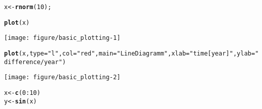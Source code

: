 \documentclass[a4paper,10pt]{book}\usepackage[]{graphicx}\usepackage[]{color}
\makeatletter
\def\maxwidth{ %
  \ifdim\Gin@nat@width>\linewidth
    \linewidth
  \else
    \Gin@nat@width
  \fi
}
\newcommand{\hlnum}[1]{\textcolor[rgb]{0.686,0.059,0.569}{#1}}%
\newcommand{\hlstr}[1]{\textcolor[rgb]{0.192,0.494,0.8}{#1}}%
\newcommand{\hlopt}[1]{\textcolor[rgb]{0,0,0}{#1}}%
\newcommand{\hlstd}[1]{\textcolor[rgb]{0.345,0.345,0.345}{#1}}%
\newcommand{\hlkwb}[1]{\textcolor[rgb]{0.69,0.353,0.396}{#1}}%
\newcommand{\hlkwc}[1]{\textcolor[rgb]{0.333,0.667,0.333}{#1}}%
\newcommand{\hlkwd}[1]{\textcolor[rgb]{0.737,0.353,0.396}{\textbf{#1}}}%
\newenvironment{kframe}{%
 \def\at@end@of@kframe{}%
 \ifinner\ifhmode%
  \def\at@end@of@kframe{\end{minipage}}%
  \begin{minipage}{\columnwidth}%
 \fi\fi%
 \def\FrameCommand##1{\hskip\@totalleftmargin \hskip-\fboxsep
 \colorbox{shadecolor}{##1}\hskip-\fboxsep
     \hskip-\linewidth \hskip-\@totalleftmargin \hskip\columnwidth}%
 \MakeFramed {\advance\hsize-\width
   \@totalleftmargin\z@ \linewidth\hsize
   \@setminipage}}%
 {\par\unskip\endMakeFramed%
 \at@end@of@kframe}
\newenvironment{knitrout}{}{} %
\makeatother
\begin{document}
\begin{knitrout}
\color{fgcolor}\begin{kframe}
\begin{alltt}
\hlstd{x} \hlkwb{<-} \hlkwd{rnorm}\hlstd{(}\hlnum{10}\hlstd{);}

\hlkwd{plot}\hlstd{(x)}
\end{alltt}
\end{kframe}
\texttt{[image: figure/basic\_plotting-1]} 
\begin{kframe}\begin{alltt}
\hlkwd{plot}\hlstd{(x,} \hlkwc{type}\hlstd{=}\hlstr{"l"}\hlstd{,} \hlkwc{col}\hlstd{=}\hlstr{"red"}\hlstd{,} \hlkwc{main}\hlstd{=}\hlstr{"Line Diagramm"}\hlstd{,} \hlkwc{xlab}\hlstd{=}\hlstr{"time [year]"}\hlstd{,} \hlkwc{ylab}\hlstd{=}\hlstr{"difference/year"}\hlstd{)}
\end{alltt}
\end{kframe}
\texttt{[image: figure/basic\_plotting-2]} 
\begin{kframe}\begin{alltt}
\hlstd{x} \hlkwb{<-} \hlkwd{c}\hlstd{(}\hlnum{0}\hlopt{:}\hlnum{10}\hlstd{)}
\hlstd{y} \hlkwb{<-} \hlkwd{sin}\hlstd{(x)}


\end{alltt}
\end{kframe}
\end{knitrout}
\end{document}
